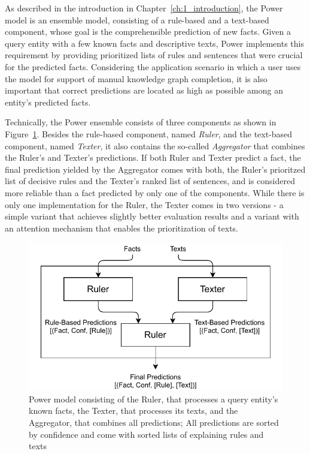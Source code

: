 As described in the introduction in Chapter~\ref{ch:1_introduction}, the Power model is an ensemble model, consisting of a rule-based and a text-based component, whose goal is the comprehensible prediction of new facts. Given a query entity with a few known facts and descriptive texts, Power implements this requirement by providing prioritized lists of rules and sentences that were crucial for the predicted facts. Considering the application scenario in which a user uses the model for support of manual knowledge graph completion, it is also important that correct predictions are located as high as possible among an entity's predicted facts.

Technically, the Power ensemble consists of three components as shown in Figure~\ref{fig:4_approach/power_architecture}. Besides the rule-based component, named \emph{Ruler}, and the text-based component, named \emph{Texter}, it also contains the so-called \emph{Aggregator} that combines the Ruler's and Texter's predictions. If both Ruler and Texter predict a fact, the final prediction yielded by the Aggregator comes with both, the Ruler's prioritzed list of decisive rules and the Texter's ranked list of sentences, and is considered more reliable than a fact predicted by only one of the components. While there is only one implementation for the Ruler, the Texter comes in two versions - a simple variant that achieves slightly better evaluation results and a variant with an attention mechanism that enables the prioritization of texts.

\begin{figure}[t]
    \centering
    \includegraphics[width=\textwidth]{4_approach/power_architecture}
    \caption{Power model consisting of the Ruler, that processes a query entity's known facts, the Texter, that processes its texts, and the Aggregator, that combines all predictions; All predictions are sorted by confidence and come with sorted lists of explaining rules and texts}
    \label{fig:4_approach/power_architecture}
\end{figure}


